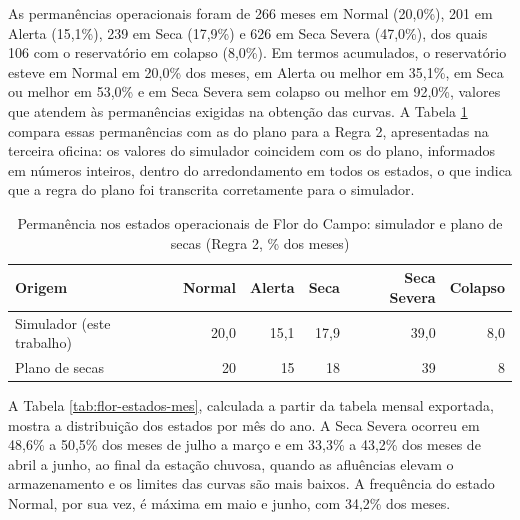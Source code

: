 As permanências operacionais foram de 266 meses em Normal (20,0\%), 201 em Alerta (15,1\%), 239 em Seca (17,9\%) e 626 em Seca Severa (47,0\%), dos quais 106 com o reservatório em colapso (8,0\%). Em termos acumulados, o reservatório esteve em Normal em 20,0\% dos meses, em Alerta ou melhor em 35,1\%, em Seca ou melhor em 53,0\% e em Seca Severa sem colapso ou melhor em 92,0\%, valores que atendem às permanências exigidas na obtenção das curvas. A Tabela \ref{tab:flor-oficina} compara essas permanências com as do plano para a Regra 2, apresentadas na terceira oficina: os valores do simulador coincidem com os do plano, informados em números inteiros, dentro do arredondamento em todos os estados, o que indica que a regra do plano foi transcrita corretamente para o simulador.

\begin{table}[H]
    \captionsetup{width=15cm}
    \caption{Permanência nos estados operacionais de Flor do Campo: simulador e plano de secas (Regra 2, \% dos meses)}
    \label{tab:flor-oficina}
    \centering
    \footnotesize
    \begin{tabular}{lrrrrr}
        \toprule
        Origem & Normal & Alerta & Seca & Seca Severa & Colapso \\
        \midrule
        Simulador (este trabalho) & 20,0 & 15,1 & 17,9 & 39,0 & 8,0 \\
        Plano de secas & 20 & 15 & 18 & 39 & 8 \\
        \bottomrule
    \end{tabular}
\end{table}

A Tabela \ref{tab:flor-estados-mes}, calculada a partir da tabela mensal exportada, mostra a distribuição dos estados por mês do ano. A Seca Severa ocorreu em 48,6\% a 50,5\% dos meses de julho a março e em 33,3\% a 43,2\% dos meses de abril a junho, ao final da estação chuvosa, quando as afluências elevam o armazenamento e os limites das curvas são mais baixos. A frequência do estado Normal, por sua vez, é máxima em maio e junho, com 34,2\% dos meses.

